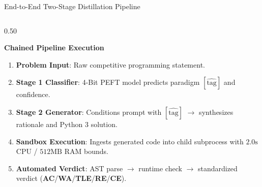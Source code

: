 \documentclass[aspectratio=169,10pt]{beamer}
\begin{document}
\begin{frame}{End-to-End Two-Stage Distillation Pipeline}
  \begin{columns}[T]
    \begin{column}{0.50\textwidth}
      \begin{block}{\textbf{Chained Pipeline Execution}}
        \begin{enumerate}\itemsep=2.5pt\scriptsize
          \item \textbf{Problem Input}: Raw competitive programming statement.
          \item \textbf{Stage 1 Classifier}: 4-Bit PEFT model predicts paradigm $[ \widehat{\text{tag}} ]$ and confidence.
          \item \textbf{Stage 2 Generator}: Conditions prompt with $[ \widehat{\text{tag}} ]$ $\to$ synthesizes rationale and Python 3 solution.
          \item \textbf{Sandbox Execution}: Ingests generated code into child subprocess with $2.0\text{s}$ CPU / $512\text{MB}$ RAM bounds.
          \item \textbf{Automated Verdict}: AST parse $\to$ runtime check $\to$ standardized verdict (\textbf{AC}/\textbf{WA}/\textbf{TLE}/\textbf{RE}/\textbf{CE}).
        \end{enumerate}
      \end{block}
    \end{column}


\end{columns}
\end{frame}
\end{document}
